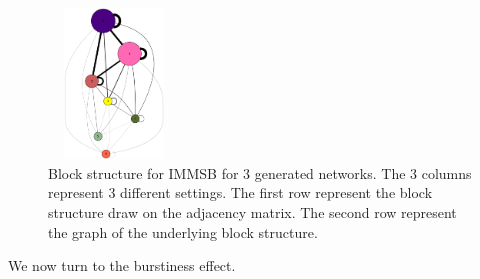 \begin{figure}[h]
	\endminipage
	\includegraphics[width=3.5cm, height=4cm]{img/M_g_regular/graph_dot}
	\endminipage
	\caption{Block structure for IMMSB for 3 generated networks. The 3 columns represent 3 different settings. The first row represent the block structure draw on the adjacency matrix. The second row represent the graph of the underlying block structure.}
	\label{fig:gen_blocks_mmsb}
\end{figure}


 We now turn to the burstiness effect.
